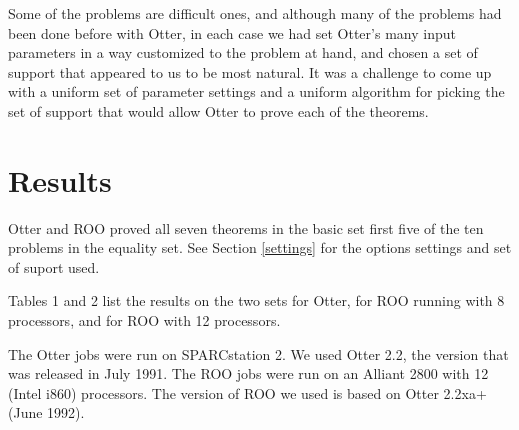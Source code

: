 Some of the problems are difficult ones, and although many of the
problems had been done before with Otter, in each case we had set
Otter's many input parameters in a way customized to the problem at
hand, and chosen a set of support that appeared to us to be most
natural.  It was a challenge to come up with a uniform set of
parameter settings and a uniform algorithm for picking the set of
support that would allow Otter to prove each of the theorems.

\section{Results}

Otter and ROO proved all seven theorems in the basic set
first five of the ten problems in the equality set.
See Section \ref{settings} for the options settings and set of suport used.

Tables 1 and 2 list the results on the two sets for Otter, for ROO
running with 8 processors, and for ROO with 12 processors.

The Otter jobs were run on SPARCstation 2.  We used Otter 2.2, the version
that was released in July 1991.
The ROO jobs were run on an Alliant 2800 with 12 (Intel i860) processors.
The version of ROO we used is based on Otter 2.2xa+ (June 1992).

